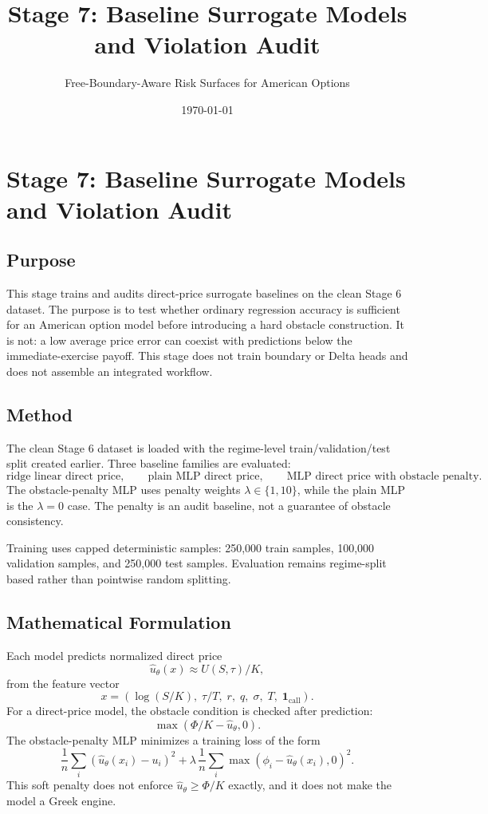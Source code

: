 \documentclass[11pt]{article}
\title{Stage 7: Baseline Surrogate Models and Violation Audit}
\author{Free-Boundary-Aware Risk Surfaces for American Options}
\date{\today}
\begin{document}
\maketitle

\section{Stage 7: Baseline Surrogate Models and Violation Audit}

\subsection{Purpose}
This stage trains and audits direct-price surrogate baselines on the clean
Stage 6 dataset. The purpose is to test whether ordinary regression accuracy is
sufficient for an American option model before introducing a hard obstacle
construction. It is not: a low average price error can coexist with predictions
below the immediate-exercise payoff. This stage does not train boundary or
Delta heads and does not assemble an integrated workflow.

\subsection{Method}
The clean Stage 6 dataset is loaded with the regime-level train/validation/test split created earlier. Three baseline families are evaluated:
\[
\text{ridge linear direct price},\qquad
\text{plain MLP direct price},\qquad
\text{MLP direct price with obstacle penalty}.
\]
The obstacle-penalty MLP uses penalty weights $\lambda\in\{1,10\}$, while the plain MLP is the $\lambda=0$ case. The penalty is an audit baseline, not a guarantee of obstacle consistency.

Training uses capped deterministic samples: 250,000 train samples, 100,000 validation samples, and 250,000 test samples. Evaluation remains regime-split based rather than pointwise random splitting.

\subsection{Mathematical Formulation}
Each model predicts normalized direct price
\[
\widehat{u}_{\theta}(x)\approx U(S,\tau)/K,
\]
from the feature vector
\[
x=\left(\log(S/K),\;\tau/T,\;r,\;q,\;\sigma,\;T,\;\mathbf{1}_{\mathrm{call}}\right).
\]
For a direct-price model, the obstacle condition is checked after prediction:
\[
\max(\Phi/K-\widehat{u}_{\theta},0).
\]
The obstacle-penalty MLP minimizes a training loss of the form
\[
\frac{1}{n}\sum_i(\widehat{u}_{\theta}(x_i)-u_i)^2
+\lambda\,\frac{1}{n}\sum_i \max(\phi_i-\widehat{u}_{\theta}(x_i),0)^2.
\]
This soft penalty does not enforce $\widehat{u}_{\theta}\geq \Phi/K$ exactly, and it does not make the model a Greek engine.
\end{document}
